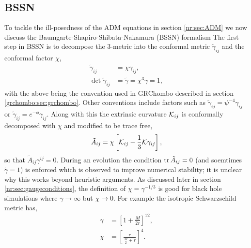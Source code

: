 \subsection{BSSN} \label{nr:sec:bssn}
To tackle the ill-posedness of the ADM equations in section \ref{nr:sec:ADM} we now discuss the Baumgarte-Shapiro-Shibata-Nakamura (BSSN) formalism \cite{Baumgarte:1998te} The first step in BSSN is to decompose the 3-metric into the conformal metric $\tilde{\gamma}_{ij}$ and the conformal factor $\chi$,
\begin{align} 
\tilde{\gamma}_{ij} &= \chi \gamma_{ij},\\
 \det{\tilde{\gamma}_{ij}} &= \tilde{\gamma} = \chi^3\gamma = 1,
\end{align}
with the above being the convention used in {\sc GRChombo} described in section \ref{grchombo:sec:grchombo}. Other conventions include factors such as
$\tilde{\gamma}_{ij} = \psi^{-4}\gamma_{ij}$ or $\tilde{\gamma}_{ij} =e^{-\phi}\gamma_{ij}$.
Along with this the extrinsic curvature $\mathcal{K}_{ij}$ is conformally decomposed with $\chi$ and modified to be trace free,
\begin{equation} \tilde{A}_{ij} = \chi\left[ \mathcal{K}_{ij}-\frac{1}{3}\mathcal{K}\gamma_{ij}\right], \end{equation} so that $\tilde{A}_{ij}\gamma^{ij}=0$.
During an evolution the condition $\trace{\tilde{A}_{ij}=0}$ (and soemtimes $\tilde{\gamma}=1$) is enforced which is observed to improve numerical stability; it is unclear why this works beyond heuristic arguments. As discussed later in section \ref{nr:sec:gaugeconditions}, the definition of $\chi = \gamma^{-1/3}$ is good for black hole simulations where $\gamma\rightarrow\infty$ but $\chi \rightarrow 0$. For example the isotropic Schwarzschild metric has, 
\begin{align}
\gamma &= \left[ 1+ \frac{M}{2r}\right]^{12},\\
\chi &=\left[ \frac{r}{\frac{M}{2} + r}\right]^4.
\end{align} 

